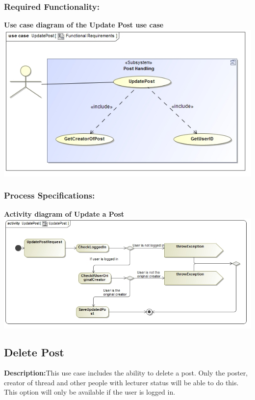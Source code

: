 \documentclass[a4paper,11pt]{article}
\begin{document}
\subsubsection{Required Functionality:} 
\textbf{Use case diagram of the Update Post use case}\\
\includegraphics[width=1\linewidth]{./Images/PostHandling/postUpdate.jpg}\\
\subsubsection{Process Specifications:} 
\textbf{Activity diagram of Update a Post}\\ 
\includegraphics[width=1\linewidth]{./Images/PostHandling/postUpdateAct.jpg}\\

\subsection{Delete Post}
\textbf{Description:}This use case includes the ability to delete a post. Only the poster, creator of thread and other people with lecturer status will be able to do this.
This option will only be available if the user is logged in.
\end{document}
